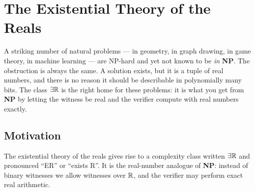 
\chapter{The Existential Theory of the Reals}
\label{ch:etr}

A striking number of natural problems --- in geometry, in graph drawing, in game
theory, in machine learning --- are NP-hard and yet not known to be \emph{in}
\textbf{NP}. The obstruction is always the same. A solution exists, but it is a
tuple of real numbers, and there is no reason it should be describable in
polynomially many bits. The class $\exists\mathbb{R}$ is the right home for these problems: it
is what you get from \textbf{NP} by letting the witness be real and the verifier
compute with real numbers exactly.

\begin{goals}
\end{goals}

\section{Motivation}
\label{sec:etr-motivation}

The existential theory of the reals gives rise to a complexity class written
$\exists\mathbb{R}$ and pronounced ``ER'' or ``exists R''. It is the real-number analogue of
\textbf{NP}: instead of binary witnesses we allow witnesses over $\mathbb{R}$, and the
verifier may perform exact real arithmetic.

